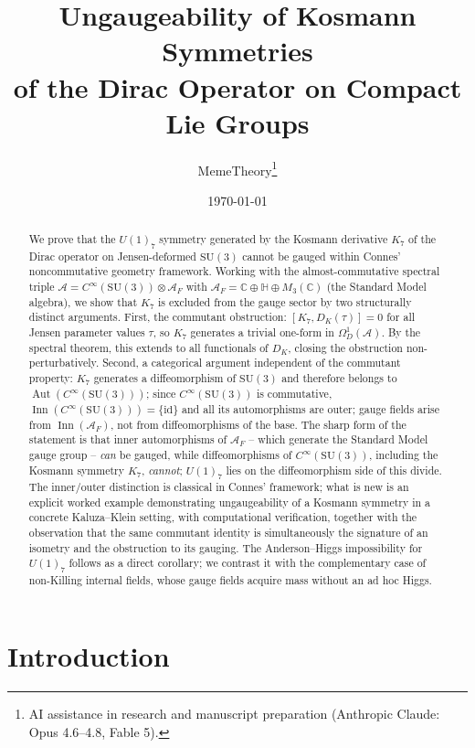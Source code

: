 \documentclass[12pt]{article}
\title{Ungaugeability of Kosmann Symmetries\\of the Dirac Operator on Compact Lie Groups}
\author{MemeTheory\thanks{AI assistance in research and manuscript preparation (Anthropic Claude: Opus 4.6--4.8, Fable 5).}}
\date{\today}
\theoremstyle{definition}
\theoremstyle{remark}
\newcommand{\Alg}{\mathcal{A}}
\newcommand{\Inn}{\operatorname{Inn}}
\newcommand{\Aut}{\operatorname{Aut}}
\begin{document}
\maketitle

\begin{abstract}
We prove that the $U(1)_7$ symmetry generated by the Kosmann derivative $K_7$ of the Dirac operator on Jensen-deformed $\mathrm{SU}(3)$ cannot be gauged within Connes' noncommutative geometry framework.  Working with the almost-commutative spectral triple $\Alg = C^\infty(\mathrm{SU}(3)) \otimes \Alg_F$ with $\Alg_F = \mathbb{C} \oplus \mathbb{H} \oplus M_3(\mathbb{C})$ (the Standard Model algebra), we show that $K_7$ is excluded from the gauge sector by two structurally distinct arguments.  First, the commutant obstruction: $[K_7, D_K(\tau)] = 0$ for all Jensen parameter values $\tau$, so $K_7$ generates a trivial one-form in $\Omega^1_D(\Alg)$.  By the spectral theorem, this extends to all functionals of $D_K$, closing the obstruction non-perturbatively.  Second, a categorical argument independent of the commutant property: $K_7$ generates a diffeomorphism of $\mathrm{SU}(3)$ and therefore belongs to $\Aut(C^\infty(\mathrm{SU}(3)))$; since $C^\infty(\mathrm{SU}(3))$ is commutative, $\Inn(C^\infty(\mathrm{SU}(3))) = \{\mathrm{id}\}$ and all its automorphisms are outer; gauge fields arise from $\Inn(\Alg_F)$, not from diffeomorphisms of the base.  The sharp form of the statement is that inner automorphisms of $\Alg_F$ -- which generate the Standard Model gauge group -- \emph{can} be gauged, while diffeomorphisms of $C^\infty(\mathrm{SU}(3))$, including the Kosmann symmetry $K_7$, \emph{cannot}; $U(1)_7$ lies on the diffeomorphism side of this divide.  The inner/outer distinction is classical in Connes' framework; what is new is an explicit worked example demonstrating ungaugeability of a Kosmann symmetry in a concrete Kaluza--Klein setting, with computational verification, together with the observation that the same commutant identity is simultaneously the signature of an isometry and the obstruction to its gauging.  The Anderson--Higgs impossibility for $U(1)_7$ follows as a direct corollary; we contrast it with the complementary case of non-Killing internal fields, whose gauge fields acquire mass without an ad hoc Higgs.
\end{abstract}

\section{Introduction}
\label{sec:intro}
\end{document}

